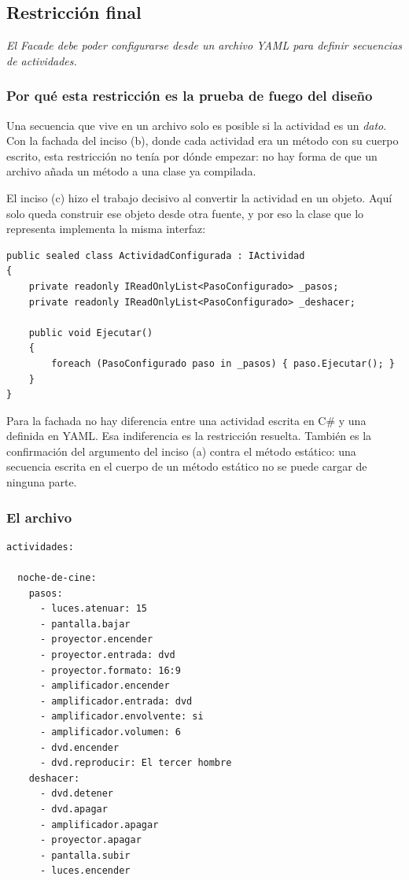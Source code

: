 {}
\subsection*{Restricción final}

\sloppy

\textit{El Facade debe poder configurarse desde un archivo YAML para definir secuencias de
actividades.}

\vspace{0.4cm}

\subsubsection*{Por qué esta restricción es la prueba de fuego del diseño}

Una secuencia que vive en un archivo solo es posible si la actividad es un \emph{dato}. Con la
fachada del inciso (b), donde cada actividad era un método con su cuerpo escrito, esta
restricción no tenía por dónde empezar: no hay forma de que un archivo añada un método a una
clase ya compilada.

El inciso (c) hizo el trabajo decisivo al convertir la actividad en un objeto. Aquí solo queda
construir ese objeto desde otra fuente, y por eso la clase que lo representa implementa la
misma interfaz:

{\small
\begin{verbatim}
public sealed class ActividadConfigurada : IActividad
{
    private readonly IReadOnlyList<PasoConfigurado> _pasos;
    private readonly IReadOnlyList<PasoConfigurado> _deshacer;

    public void Ejecutar()
    {
        foreach (PasoConfigurado paso in _pasos) { paso.Ejecutar(); }
    }
}
\end{verbatim}
}

Para la fachada no hay diferencia entre una actividad escrita en C\# y una definida en YAML.
Esa indiferencia es la restricción resuelta. También es la confirmación del argumento del
inciso (a) contra el método estático: una secuencia escrita en el cuerpo de un método estático
no se puede cargar de ninguna parte.

\subsubsection*{El archivo}

{\small
\begin{verbatim}
actividades:

  noche-de-cine:
    pasos:
      - luces.atenuar: 15
      - pantalla.bajar
      - proyector.encender
      - proyector.entrada: dvd
      - proyector.formato: 16:9
      - amplificador.encender
      - amplificador.entrada: dvd
      - amplificador.envolvente: si
      - amplificador.volumen: 6
      - dvd.encender
      - dvd.reproducir: El tercer hombre
    deshacer:
      - dvd.detener
      - dvd.apagar
      - amplificador.apagar
      - proyector.apagar
      - pantalla.subir
      - luces.encender
\end{verbatim}
}

